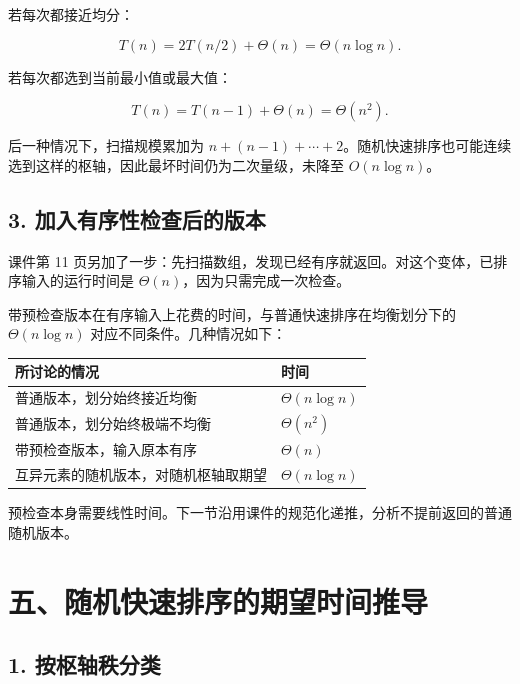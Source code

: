\documentclass[
  UTF8,fontset=none,zihao=5]{ctexart}
\let\OldSection\section
\renewcommand{\section}{\Needspace{5\baselineskip}\OldSection}
\let\OldSubsection\subsection
\renewcommand{\subsection}{\Needspace{4\baselineskip}\OldSubsection}
\begin{document}
若每次都接近均分：

\[
T(n)=2T(n/2)+\Theta(n)=\Theta(n\log n).
\]

若每次都选到当前最小值或最大值：

\[
T(n)=T(n-1)+\Theta(n)=\Theta(n^2).
\]

后一种情况下，扫描规模累加为
\(n+(n-1)+\cdots+2\)。随机快速排序也可能连续选到这样的枢轴，因此最坏时间仍为二次量级，未降至
\(O(n\log n)\)。

\hypertarget{ux52a0ux5165ux6709ux5e8fux6027ux68c0ux67e5ux540eux7684ux7248ux672c}{%
\subsection{3.
加入有序性检查后的版本}\label{ux52a0ux5165ux6709ux5e8fux6027ux68c0ux67e5ux540eux7684ux7248ux672c}}

课件第 11
页另加了一步：先扫描数组，发现已经有序就返回。对这个变体，已排序输入的运行时间是
\(\Theta(n)\)，因为只需完成一次检查。

带预检查版本在有序输入上花费的时间，与普通快速排序在均衡划分下的
\(\Theta(n\log n)\) 对应不同条件。几种情况如下：

\begin{longtable}[]{@{}
  >{\raggedright\arraybackslash}p{}
  >{\raggedright\arraybackslash}p{}@{}}
\toprule
所讨论的情况 & 时间 \\
\midrule
\endhead
普通版本，划分始终接近均衡 & \(\Theta(n\log n)\) \\
普通版本，划分始终极端不均衡 & \(\Theta(n^2)\) \\
带预检查版本，输入原本有序 & \(\Theta(n)\) \\
互异元素的随机版本，对随机枢轴取期望 & \(\Theta(n\log n)\) \\
\bottomrule
\end{longtable}

预检查本身需要线性时间。下一节沿用课件的规范化递推，分析不提前返回的普通随机版本。

\hypertarget{ux4e94ux968fux673aux5febux901fux6392ux5e8fux7684ux671fux671bux65f6ux95f4ux63a8ux5bfc}{%
\section{五、随机快速排序的期望时间推导}\label{ux4e94ux968fux673aux5febux901fux6392ux5e8fux7684ux671fux671bux65f6ux95f4ux63a8ux5bfc}}

\hypertarget{ux6309ux67a2ux8f74ux79e9ux5206ux7c7b}{%
\subsection{1.
按枢轴秩分类}\label{ux6309ux67a2ux8f74ux79e9ux5206ux7c7b}}
\end{document}
